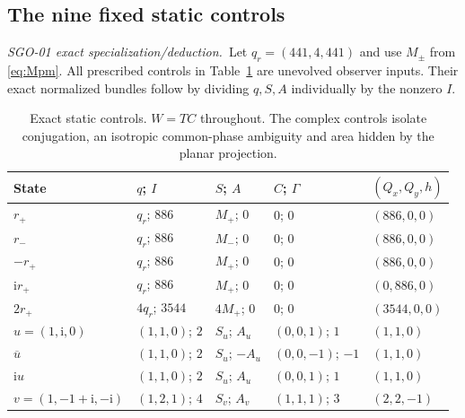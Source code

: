 \documentclass[11pt,a4paper]{article}
\newcommand{\ii}{\mathrm i}\newcommand{\tr}{\operatorname{tr}}
\newcommand{\deduction}{\textit{SGO-01 exact specialization/deduction.}}
\begin{document}
\subsection{The nine fixed static controls}\label{sec:controls}
\deduction\ Let $q_r=(441,4,441)$ and use $M_\pm$ from \eqref{eq:Mpm}. All prescribed controls in Table~\ref{tab:controls} are unevolved observer inputs. Their exact normalized bundles follow by dividing $q,S,A$ individually by the nonzero $I$.
\begin{table}[htbp]\centering\small
\renewcommand{\arraystretch}{1.1}
\begin{tabular}{lllll}\toprule
State & $q$; $I$ & $S$; $A$ & $C$; $\Gamma$ & $(Q_x,Q_y,h)$\\\midrule
$r_+$ & $q_r$; $886$ & $M_+$; $0$ & $0$; $0$ & $(886,0,0)$\\
$r_-$ & $q_r$; $886$ & $M_-$; $0$ & $0$; $0$ & $(886,0,0)$\\
$-r_+$ & $q_r$; $886$ & $M_+$; $0$ & $0$; $0$ & $(886,0,0)$\\
$\ii r_+$ & $q_r$; $886$ & $M_+$; $0$ & $0$; $0$ & $(0,886,0)$\\
$2r_+$ & $4q_r$; $3544$ & $4M_+$; $0$ & $0$; $0$ & $(3544,0,0)$\\
$u=(1,\ii,0)$ & $(1,1,0)$; $2$ & $S_u$; $A_u$ & $(0,0,1)$; $1$ & $(1,1,0)$\\
$\overline u$ & $(1,1,0)$; $2$ & $S_u$; $-A_u$ & $(0,0,-1)$; $-1$ & $(1,1,0)$\\
$\ii u$ & $(1,1,0)$; $2$ & $S_u$; $A_u$ & $(0,0,1)$; $1$ & $(1,1,0)$\\
$v=(1,-1+\ii,-\ii)$ & $(1,2,1)$; $4$ & $S_v$; $A_v$ & $(1,1,1)$; $3$ & $(2,2,-1)$\\\bottomrule
\end{tabular}
\caption{Exact static controls. $W=TC$ throughout. The complex controls isolate conjugation, an isotropic common-phase ambiguity and area hidden by the planar projection.}
\label{tab:controls}
\end{table}

\clearpage
\end{document}
